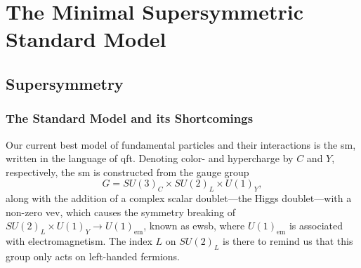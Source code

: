 \chapter{The Minimal Supersymmetric Standard Model}


\section{Supersymmetry}


\subsection{The Standard Model and its Shortcomings}\label{sec:standard_model}
Our current best model of fundamental particles and their interactions is the \gls{sm}, written in the language of \gls{qft}. Denoting color- and hypercharge by $C$ and $Y$, respectively, the \gls{sm} is constructed from the gauge group
\begin{equation}
    G=SU(3)_C \times SU(2)_L \times U(1)_Y,
    \label{eq:sm_gauge_group}
\end{equation}
along with the addition of a complex scalar doublet---the Higgs doublet---with a non-zero \gls{vev}, which causes the symmetry breaking of $SU(2)_L \times U(1)_Y \to U(1)_{\mathrm{em}}$, known as \gls{ewsb}, where $U(1)_{\mathrm{em}}$ is associated with electromagnetism.
The index $L$ on $SU(2)_L$ is there to remind us that this group only acts on left-handed fermions.


